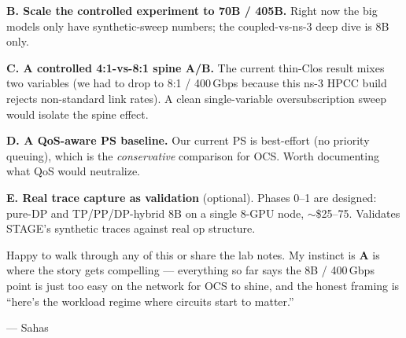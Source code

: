 \documentclass[11pt]{article}
\begin{document}
\textbf{B. Scale the controlled experiment to 70B / 405B.} Right now the big models only have synthetic-sweep numbers; the coupled-vs-ns-3 deep dive is 8B only.

\textbf{C. A controlled 4:1-vs-8:1 spine A/B.} The current thin-Clos result mixes two variables (we had to drop to 8:1 / 400\,Gbps because this ns-3 HPCC build rejects non-standard link rates). A clean single-variable oversubscription sweep would isolate the spine effect.

\textbf{D. A QoS-aware PS baseline.} Our current PS is best-effort (no priority queuing), which is the \textit{conservative} comparison for OCS. Worth documenting what QoS would neutralize.

\textbf{E. Real trace capture as validation} (optional). Phases 0--1 are designed: pure-DP and TP/PP/DP-hybrid 8B on a single 8-GPU node, $\sim$\$25--75. Validates STAGE's synthetic traces against real op structure.

\vspace{4pt}
Happy to walk through any of this or share the lab notes. My instinct is \textbf{A} is where the story gets compelling --- everything so far says the 8B / 400\,Gbps point is just too easy on the network for OCS to shine, and the honest framing is ``here's the workload regime where circuits start to matter.''

\vspace{6pt}
--- Sahas
\end{document}
